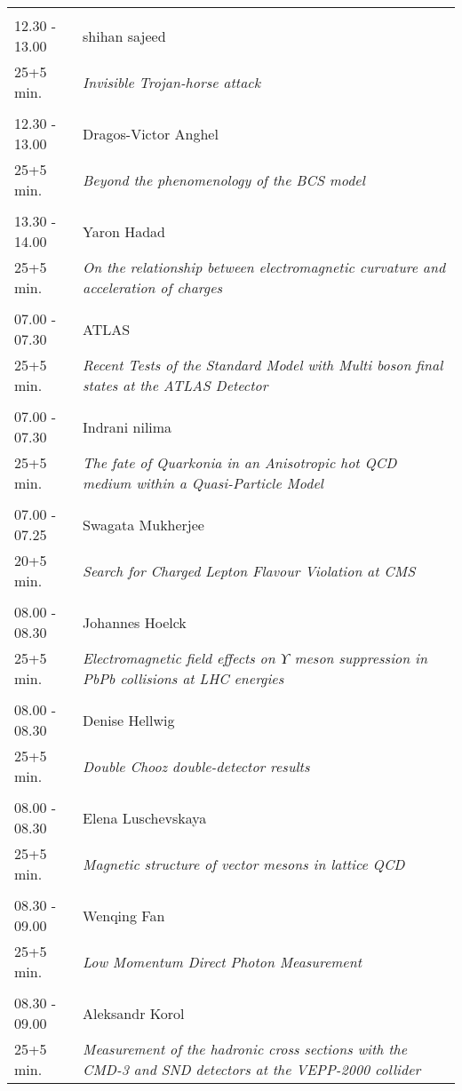 \begin{longtable}{p{3cm}p{13cm}}
 & \\ 
12.30 - 13.00 & shihan sajeed\\ 
25+5 min. & {\it Invisible Trojan-horse attack}\\ 
 & \\ 
12.30 - 13.00 & Dragos-Victor Anghel\\ 
25+5 min. & {\it Beyond the phenomenology of the BCS model}\\ 
 & \\ 
13.30 - 14.00 & Yaron Hadad\\ 
25+5 min. & {\it On the relationship between electromagnetic curvature and acceleration of charges}\\ 
 & \\ 
07.00 - 07.30 & ATLAS\\ 
25+5 min. & {\it Recent Tests of the Standard Model with Multi boson final states at the ATLAS Detector}\\ 
 & \\ 
07.00 - 07.30 & Indrani nilima\\ 
25+5 min. & {\it The fate of Quarkonia in an Anisotropic hot QCD medium within a Quasi-Particle Model}\\ 
 & \\ 
07.00 - 07.25 & Swagata Mukherjee\\ 
20+5 min. & {\it Search for Charged Lepton Flavour Violation at CMS}\\ 
 & \\ 
08.00 - 08.30 & Johannes Hoelck\\ 
25+5 min. & {\it Electromagnetic field effects on ϒ meson suppression in PbPb collisions at LHC energies}\\ 
 & \\ 
08.00 - 08.30 & Denise Hellwig\\ 
25+5 min. & {\it Double Chooz double-detector results}\\ 
 & \\ 
08.00 - 08.30 & Elena Luschevskaya\\ 
25+5 min. & {\it Magnetic structure of vector mesons in lattice QCD}\\ 
 & \\ 
08.30 - 09.00 & Wenqing Fan\\ 
25+5 min. & {\it Low Momentum Direct Photon Measurement}\\ 
 & \\ 
08.30 - 09.00 & Aleksandr Korol\\ 
25+5 min. & {\it Measurement of the hadronic cross sections with the CMD-3 and SND detectors at the VEPP-2000 collider}\\ 

\end{longtable}
